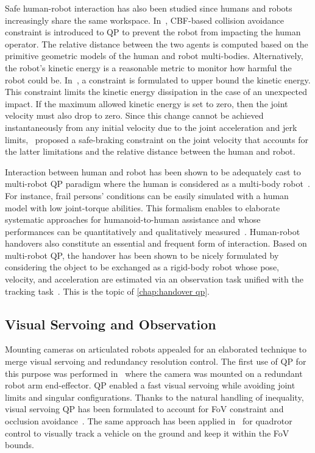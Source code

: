 Safe human-robot interaction has also been studied since humans and robots increasingly share the same workspace. In~\cite{landi2019ecc,ferraguti2020ras}, CBF-based collision avoidance constraint is introduced to QP to prevent the robot from impacting the human operator. The relative distance between the two agents is computed based on the primitive geometric models of the human and robot multi-bodies. Alternatively, 
the robot's kinetic energy is a reasonable metric to monitor how harmful the robot could be. In~\cite{meguenani2016iser,joseph2018iser}, a constraint is formulated to upper bound the kinetic energy. This constraint limits the kinetic energy dissipation in the case of an unexpected impact. If the maximum allowed kinetic energy is set to zero, then the joint velocity must also drop to zero. Since this change cannot be achieved instantaneously from any initial velocity due to the joint acceleration and jerk limits,~\cite{joseph2020iros} proposed a safe-braking constraint on the joint velocity that accounts for the latter limitations and  the relative distance between the human and robot.   

Interaction between human and robot has been shown to be adequately cast to multi-robot QP paradigm where the human is considered as a multi-body robot~\cite{bolotnikova2020roman,bolotnikova2021sii}. For instance, frail persons' conditions can be easily simulated with a human model with low joint-torque abilities. This formalism enables to elaborate systematic approaches for humanoid-to-human assistance
and whose performances can be quantitatively and qualitatively measured~\cite{bolotnikova2021ral}. Human-robot handovers also constitute an essential and frequent form of interaction. Based on multi-robot QP, the handover has been shown to be nicely formulated by considering the object to be exchanged as a rigid-body robot whose pose, velocity, and acceleration are estimated via an observation task unified with the tracking task~\cite{djeha2022arxiv}. This is the topic of \cref{chap:handover qp}.  

\subsection{Visual Servoing and Observation}
Mounting cameras on articulated robots appealed for an elaborated technique to merge visual servoing and redundancy resolution control. The first use of QP for this purpose was performed in~\cite{ellekilde2007ijars} where the camera was mounted on a redundant robot arm end-effector. QP enabled a fast visual servoing while avoiding joint limits and singular configurations. Thanks to the natural handling of inequality, visual servoing QP has been formulated to account for FoV constraint and occlusion avoidance~\cite{agravante2017ral}. The same approach has been applied in~\cite{chen2021sensors} for quadrotor control to visually track a vehicle on the ground and keep it within the FoV bounds.  

